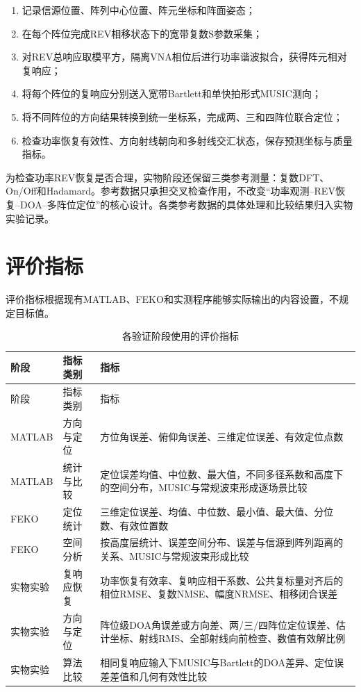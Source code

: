 \documentclass[UTF8,a4paper,12pt]{ctexart}
\begin{document}
\begin{enumerate}
  \item 记录信源位置、阵列中心位置、阵元坐标和阵面姿态；
  \item 在每个阵位完成REV相移状态下的宽带复数S参数采集；
  \item 对REV总响应取模平方，隔离VNA相位后进行功率谐波拟合，获得阵元相对复响应；
  \item 将每个阵位的复响应分别送入宽带Bartlett和单快拍形式MUSIC测向；
  \item 将不同阵位的方向结果转换到统一坐标系，完成两、三和四阵位联合定位；
  \item 检查功率恢复有效性、方向射线朝向和多射线交汇状态，保存预测坐标与质量指标。
\end{enumerate}

为检查功率REV恢复是否合理，实物阶段还保留三类参考测量：复数DFT、On/Off和Hadamard。参考数据只承担交叉检查作用，不改变“功率观测--REV恢复--DOA--多阵位定位”的核心设计。各类参考数据的具体处理和比较结果归入实物实验记录。

\section{评价指标}

评价指标根据现有MATLAB、FEKO和实测程序能够实际输出的内容设置，不规定目标值。

\begin{longtable}{>{\raggedright\arraybackslash}p{3.0cm}>{\raggedright\arraybackslash}p{4.1cm}>{\raggedright\arraybackslash}p{7.2cm}}
\caption{各验证阶段使用的评价指标}\\
\toprule
阶段 & 指标类别 & 指标\\
\midrule
\endfirsthead
\toprule
阶段 & 指标类别 & 指标\\
\midrule
\endhead
\bottomrule
\endfoot
MATLAB & 方向与定位 & 方位角误差、俯仰角误差、三维定位误差、有效定位点数\\
MATLAB & 统计与比较 & 定位误差均值、中位数、最大值，不同多径系数和高度下的空间分布，MUSIC与常规波束形成逐场景比较\\
FEKO & 定位统计 & 三维定位误差、均值、中位数、最小值、最大值、分位数、有效位置数\\
FEKO & 空间分析 & 按高度层统计、误差空间分布、误差与信源到阵列距离的关系、MUSIC与常规波束形成比较\\
实物实验 & 复响应恢复 & 功率恢复有效率、复响应相干系数、公共复标量对齐后的相位RMSE、复数NMSE、幅度NRMSE、相移闭合误差\\
实物实验 & 方向与定位 & 阵位级DOA角误差或方向差、两/三/四阵位定位误差、估计坐标、射线RMS、全部射线向前检查、数值有效解比例\\
实物实验 & 算法比较 & 相同复响应输入下MUSIC与Bartlett的DOA差异、定位误差差值和几何有效性比较\\
\end{longtable}
\end{document}
